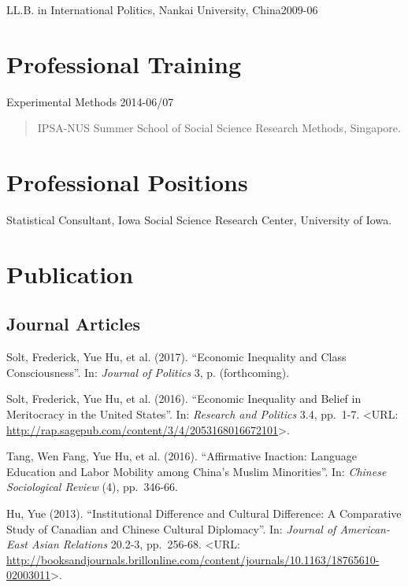 \documentclass[10.5pt,]{article}
\begin{document}
LL.B. in International Politics, Nankai University, China\hfill 2009-06

\section{Professional Training}\label{professional-training}

Experimental Methods \hfill 2014-06/07

\begin{quote}
\footnotesize IPSA-NUS Summer School of Social Science Research Methods,
Singapore.
\end{quote}

\section{Professional Positions}\label{professional-positions}

Statistical Consultant, Iowa Social Science Research Center, University
of Iowa.

\section{Publication}\label{publication}

\subsection{Journal Articles}\label{journal-articles}

Solt, Frederick, Yue Hu, et al. (2017). ``Economic Inequality and Class
Consciousness''. In: \emph{Journal of Politics} 3, p. (forthcoming).

Solt, Frederick, Yue Hu, et al. (2016). ``Economic Inequality and Belief
in Meritocracy in the United States''. In: \emph{Research and Politics}
3.4, pp.~1-7. \textless{}URL:
\url{http://rap.sagepub.com/content/3/4/2053168016672101}\textgreater{}.

Tang, Wen Fang, Yue Hu, et al. (2016). ``Affirmative Inaction: Language
Education and Labor Mobility among China's Muslim Minorities''. In:
\emph{Chinese Sociological Review} (4), pp.~346-66.

Hu, Yue (2013). ``Institutional Difference and Cultural Difference: A
Comparative Study of Canadian and Chinese Cultural Diplomacy''. In:
\emph{Journal of American-East Asian Relations} 20.2-3, pp.~256-68.
\textless{}URL:
\url{http://booksandjournals.brillonline.com/content/journals/10.1163/18765610-02003011}\textgreater{}.
\end{document}
